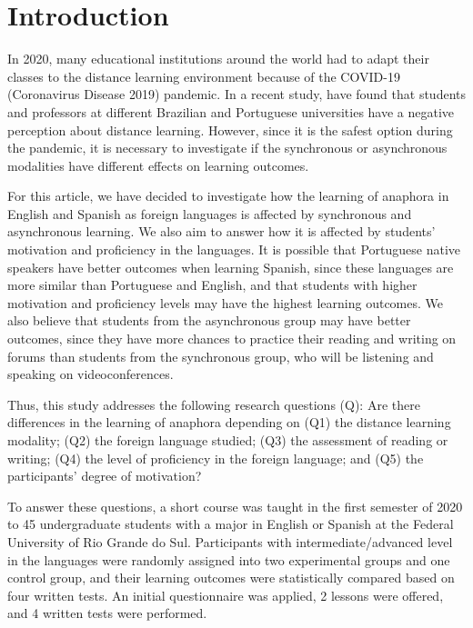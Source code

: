 \documentclass{textolivre}
\begin{document}
\section{Introduction}\label{sec-intro}
In 2020, many educational institutions around the world had to adapt their
classes to the distance learning environment because of the COVID-19
(Coronavirus Disease 2019) pandemic. In a recent study, \textcite{bruscato_teaching_2020} 
have found that students and professors at different Brazilian and
Portuguese universities have a negative perception about distance learning.
However, since it is the safest option during the pandemic, it is necessary to
investigate if the synchronous or asynchronous modalities have different
effects on learning outcomes.

For this article, we have decided to investigate how the learning of anaphora
in English and Spanish as foreign languages is affected by synchronous and
asynchronous learning. We also aim to answer how it is affected by students’
motivation and proficiency in the languages. It is possible that Portuguese
native speakers have better outcomes when learning Spanish, since these
languages are more similar than Portuguese and English, and that students with
higher motivation and proficiency levels may have the highest learning
outcomes. We also believe that students from the asynchronous group may have
better outcomes, since they have more chances to practice their reading and
writing on forums than students from the synchronous group, who will be
listening and speaking on videoconferences.

Thus, this study addresses the following research questions (Q): Are there
differences in the learning of anaphora depending on (Q1) the distance learning
modality; (Q2) the foreign language studied; (Q3) the assessment of reading or
writing; (Q4) the level of proficiency in the foreign language; and (Q5) the
participants’ degree of motivation?

To answer these questions, a short course was taught in the first semester of
2020 to 45 undergraduate students with a major in English or Spanish at the
Federal University of Rio Grande do Sul. Participants with
intermediate/advanced level in the languages were randomly assigned into two
experimental groups and one control group, and their learning outcomes were
statistically compared based on four written tests. An initial questionnaire
was applied, 2 lessons were offered, and 4 written tests were performed.
\end{document}

